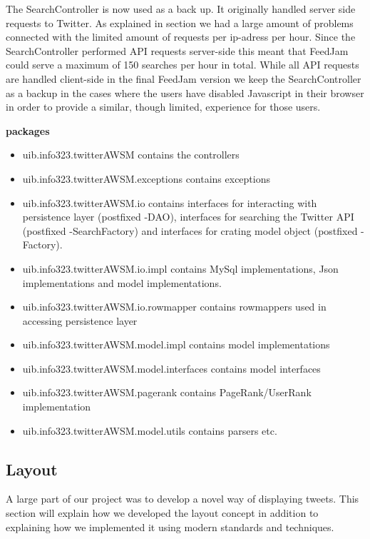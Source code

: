 The SearchController is now used as a back up. It originally handled server side requests to Twitter. As explained in section \label{twitterProblem} we had a large amount of problems connected with the limited amount of requests per ip-adress per hour. Since the SearchController performed API requests server-side this meant that FeedJam could serve a maximum of 150 searches per hour in total. While all API requests are handled client-side in the final FeedJam version we keep the SearchController as a backup in the cases where the users have disabled Javascript in their browser in order to provide a similar, though limited, experience for those users.


{\bf packages}
\begin{itemize}
  \item uib.info323.twitterAWSM contains the controllers
  \item uib.info323.twitterAWSM.exceptions contains exceptions
  \item uib.info323.twitterAWSM.io contains interfaces for interacting with persistence layer (postfixed -DAO), interfaces for searching the Twitter API (postfixed -SearchFactory) and interfaces for crating model object (postfixed -Factory).
  \item uib.info323.twitterAWSM.io.impl contains MySql implementations, Json implementations and model implementations. 
  \item uib.info323.twitterAWSM.io.rowmapper contains rowmappers used in accessing persistence layer
  \item uib.info323.twitterAWSM.model.impl contains model implementations
  \item uib.info323.twitterAWSM.model.interfaces contains model interfaces

  \item uib.info323.twitterAWSM.pagerank contains PageRank/UserRank implementation
  \item uib.info323.twitterAWSM.model.utils contains parsers etc.
\end{itemize}


\subsection{Layout} %
A large part of our project was to develop a novel way of displaying tweets. This section will explain how we developed the layout concept in addition to explaining how we implemented it using modern standards and techniques.

